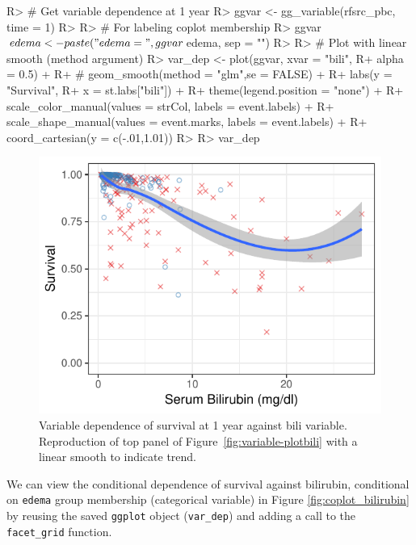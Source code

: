 \documentclass[article]{jss}
\begin{document}
\begin{Schunk}
\begin{Sinput}
R> # Get variable dependence at 1 year
R> ggvar <- gg_variable(rfsrc_pbc, time = 1)
R> 
R> # For labeling coplot membership
R> ggvar$edema <- paste("edema = ", ggvar$edema, sep = "")
R> 
R> # Plot with linear smooth (method argument)
R> var_dep <- plot(ggvar, xvar = "bili",
R+                 alpha = 0.5) +
R+ #  geom_smooth(method = "glm",se = FALSE) +
R+   labs(y = "Survival",
R+        x = st.labs["bili"]) +
R+   theme(legend.position = "none") +
R+   scale_color_manual(values = strCol, labels = event.labels) +
R+   scale_shape_manual(values = event.marks, labels = event.labels) +
R+   coord_cartesian(y = c(-.01,1.01))
R> 
R> var_dep
\end{Sinput}
\begin{figure}[!htb]

{\centering \includegraphics{fig-rfs/rfs-var_dep-1} 

}

\caption{Variable dependence of survival at 1 year against bili variable. Reproduction of top panel of Figure~\ref{fig:variable-plotbili} with a linear smooth to indicate trend.}\label{fig:var_dep}
\end{figure}
\end{Schunk}

We can view the conditional dependence of survival against bilirubin,
conditional on \texttt{edema} group membership (categorical variable) in
Figure \ref{fig:coplot_bilirubin} by reusing the saved \texttt{ggplot}
object (\texttt{var\_dep}) and adding a call to the \texttt{facet\_grid}
function.
\end{document}
